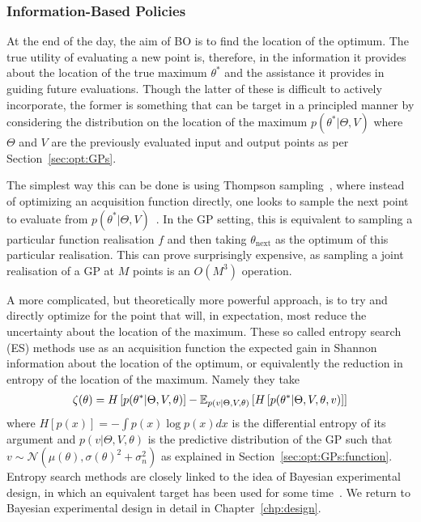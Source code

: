 \subsubsection{Information-Based Policies}
\label{sec:opt:BO:acq:inf}

At the end of the day, the aim of BO is to find the location of the optimum.  The true utility of
evaluating a new point is, therefore, in the information it provides about the location of the
true maximum $\theta^*$ and the assistance it provides in guiding future evaluations.  Though 
the latter of these is difficult to actively incorporate, the former is something that can be
target in a principled manner by considering the distribution on the location of the maximum
$p(\theta^* | \Theta, V)$ where $\Theta$ and $V$ are the previously evaluated input and output
points as per Section~\ref{sec:opt:GPs}.

The simplest way this can be done is using Thompson sampling~\citep{thompson1933likelihood}, 
where instead of optimizing an acquisition function directly, one looks to sample the next
point to evaluate from $p(\theta^* | \Theta, V)$~\citep{shahriari2014entropy,bijl2016sequential,kandasamy2017asynchronous}.  
In the GP setting, this is equivalent to sampling a particular function realisation $f$ and then taking 
$\theta_{\text{next}}$
as the optimum of this particular realisation.  This can prove surprisingly expensive, as sampling
a joint realisation of a GP at $M$ points is an $O(M^3)$ operation.  

A more complicated, but theoretically more powerful approach, is to try and directly optimize
for the point that will, in expectation, most reduce the uncertainty about the location of the maximum.
These so called entropy search (ES) methods 
\citep{villemonteix2009informational,hennig2012entropy,hernandez2014predictive} use as an
acquisition function the expected gain in Shannon information about the location of the optimum,
or equivalently the reduction in entropy of the location of the maximum. Namely they take
\begin{align}
\label{eq:opt:ent-search}
\zeta (\theta) = H\left[p(\theta^* | \Theta, V, \theta)\right]-
\mathbb{E}_{p(v| \Theta,V, \theta)} \left[H\left[p(\theta^* | \Theta, V, \theta, v)\right]\right]
\end{align}
where $H[p(x)]=-\int p(x)\log p(x)dx$ is the differential entropy of its argument
and $p(v| \Theta,V, \theta)$ is the predictive distribution of the GP such that
$v\sim\mathcal{N}\left(\mu(\theta),\sigma(\theta)^2+\sigma_n^2\right)$ as
explained in Section~\ref{sec:opt:GPs:function}.
Entropy search methods are closely linked to the idea of Bayesian experimental design, in which an equivalent
target has been used for some time~\cite{chaloner1995bayesian}.  We return to Bayesian experimental
design in detail in Chapter~\ref{chp:design}.

